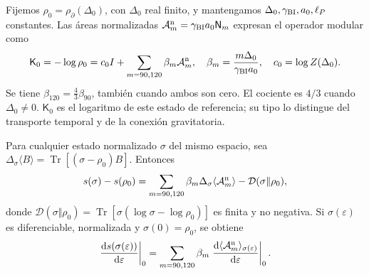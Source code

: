 Fijemos \(\rho_0=\rho_\partial(\Delta_0)\), con
\(\Delta_0\) real finito, y mantengamos
\(\Delta_0,\gamma_{\rm BI},a_0,\ell_P\) constantes. Las áreas
normalizadas \(\mathcal A_m^{\rm n}=\gamma_{\rm BI}a_0\mathsf N_m\)
expresan el operador modular como
\begin{equation}
 \mathsf K_0=-\log\rho_0
 =c_0I+\sum_{m=90,120}\beta_m\mathcal A_m^{\rm n},
 \quad \beta_m=\frac{m\Delta_0}{\gamma_{\rm BI}a_0},
 \quad c_0=\log Z(\Delta_0).
 \label{vii:eq:operador-modular-areal}
\end{equation}
Se tiene \(\beta_{120}=\tfrac43\beta_{90}\), también cuando ambos
son cero. El cociente es \(4/3\) cuando \(\Delta_0\ne0\).
\(\mathsf K_0\) es el logaritmo de este estado de referencia; su tipo
lo distingue del transporte temporal y de la conexión gravitatoria.

\begin{theorem}
\label{vii:thm:ley-modular-finita}
Para cualquier estado normalizado \(\sigma\) del mismo espacio, sea
\(\Delta_\sigma\langle B\rangle
=\operatorname{Tr}[(\sigma-\rho_0)B]\). Entonces
\begin{equation}
 s(\sigma)-s(\rho_0)
 =\sum_{m=90,120}\beta_m\Delta_\sigma\langle\mathcal A_m^{\rm n}\rangle
  -\mathcal D(\sigma\Vert\rho_0),
 \label{vii:eq:ley-modular-finita}
\end{equation}
donde
\(\mathcal D(\sigma\Vert\rho_0)
=\operatorname{Tr}[\sigma(\log\sigma-\log\rho_0)]\)
es finita y no negativa. Si \(\sigma(\varepsilon)\) es diferenciable,
normalizada y \(\sigma(0)=\rho_0\), se obtiene
\begin{equation}
 \left.\frac{\mathrm ds(\sigma(\varepsilon))}{\mathrm d\varepsilon}\right|_0
 =\sum_{m=90,120}\beta_m
   \left.\frac{\mathrm d\langle\mathcal A_m^{\rm n}\rangle_{
                 \sigma(\varepsilon)}}{\mathrm d\varepsilon}\right|_0.
 \label{vii:eq:primera-ley-modular}
\end{equation}
\end{theorem}
